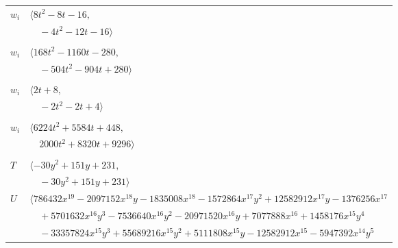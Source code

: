 \documentclass[11pt]{article}
\begin{document}
\begin{longtable}{@{}ll@{}}
$w_i$ & $\langle 8t^{2}-8t-16,$\\
 & $\quad -4t^{2}-12t-16\rangle$\\
\addlinespace[2pt]
\multicolumn{2}{@{}p{0.97\textwidth}@{}}{$i=5$, $D_i=8$, $\rho_{ij}$: $17{:}1, \allowbreak 25{:}2, \allowbreak 26{:}1, \allowbreak 30{:}1, \allowbreak 35{:}1, \allowbreak 36{:}1, \allowbreak 37{:}2, \allowbreak 38{:}2, \allowbreak 40{:}2, \allowbreak 46{:}2, \allowbreak 48{:}2, \allowbreak 53{:}1, \allowbreak 58{:}1, \allowbreak 68{:}1$}\\
$w_i$ & $\langle 168t^{2}-1160t-280,$\\
 & $\quad -504t^{2}-904t+280\rangle$\\
\addlinespace[2pt]
\multicolumn{2}{@{}p{0.97\textwidth}@{}}{$i=6$, $D_i=2$, $\rho_{ij}$: $2{:}2, \allowbreak 17{:}2, \allowbreak 22{:}1, \allowbreak 24{:}2, \allowbreak 40{:}2, \allowbreak 47{:}1, \allowbreak 49{:}1$}\\
$w_i$ & $\langle 2t+8,$\\
 & $\quad -2t^{2}-2t+4\rangle$\\
\addlinespace[2pt]
\multicolumn{2}{@{}p{0.97\textwidth}@{}}{$i=7$, $D_i=16$, $\rho_{ij}$: $16{:}1, \allowbreak 17{:}2, \allowbreak 19{:}2, \allowbreak 21{:}2, \allowbreak 26{:}2, \allowbreak 29{:}2, \allowbreak 33{:}1, \allowbreak 37{:}2, \allowbreak 39{:}1, \allowbreak 46{:}2, \allowbreak 47{:}2, \allowbreak 49{:}2, \allowbreak 53{:}2, \allowbreak 63{:}1, \allowbreak 69{:}2$}\\
$w_i$ & $\langle 6224t^{2}+5584t+448,$\\
 & $\quad 2000t^{2}+8320t+9296\rangle$\\
\addlinespace[2pt]
\multicolumn{2}{@{}p{0.97\textwidth}@{}}{$i=8$, $D_i=32$, $\rho_{ij}$: $12{:}2, \allowbreak 13{:}2, \allowbreak 20{:}1, \allowbreak 22{:}1, \allowbreak 24{:}1, \allowbreak 25{:}1, \allowbreak 26{:}1, \allowbreak 28{:}2, \allowbreak 31{:}2, \allowbreak 33{:}2, \allowbreak 53{:}1, \allowbreak 60{:}1, \allowbreak 63{:}2, \allowbreak 71{:}2$}\\
$T$ & $\langle -30y^{2}+151y+231,$\\
 & $\quad -30y^{2}+151y+231\rangle$\\
$U$ & $\langle 786432x^{19}-2097152x^{18}y-1835008x^{18}-1572864x^{17}y^{2}+12582912x^{17}y-1376256x^{17}$\\
 & $\quad +5701632x^{16}y^{3}-7536640x^{16}y^{2}-20971520x^{16}y+7077888x^{16}+1458176x^{15}y^{4}$\\
 & $\quad -33357824x^{15}y^{3}+55689216x^{15}y^{2}+5111808x^{15}y-12582912x^{15}-5947392x^{14}y^{5}$\\

\end{longtable}
\end{document}
